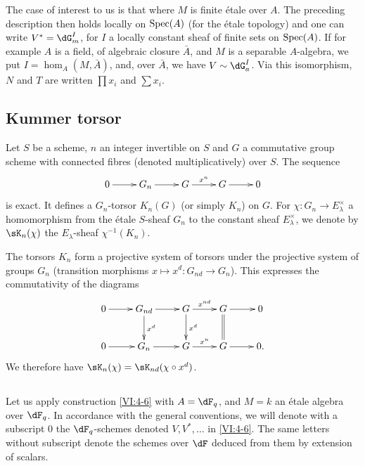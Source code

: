 The case of interest to us is that where $M$ is finite étale over $A$. The
preceding description then holds locally on $\operatorname{Spec}(A)$ (for the
étale topology) and one can write $V^\ast=\dG_m^I$, for $I$ a
locally constant sheaf of finite sets on $\operatorname{Spec}(A)$. If for example $A$ is a
field, of algebraic closure $\bar A$, and $M$ is a separable
$A$-algebra, we put $I=\hom_A(M,\bar A)$, and, over $\bar A$, we have
$V\sim \dG_a^I$. Via this isomorphism, $N$ and $T$ are written $\prod x_i$ and
$\sum x_i$. 





\subsection{Kummer torsor}\label{VI:4-7}

Let $S$ be a scheme, $n$ an integer invertible on $S$ and $G$ a commutative
group scheme with connected fibres (denoted multiplicatively) over $S$.
The sequence 
\[\xymatrix{
  0 \ar[r] 
    & G_n \ar[r] 
    & G \ar[r]^-{x^n} 
    & G \ar[r] 
    & 0 
}\]
is exact. It defines a $G_n$-torsor $K_n(G)$ (or simply $K_n$) on
$G$. For $\chi:G_n \to E_\lambda^\times$ a homomorphism from the étale
$S$-sheaf $G_n$ to the constant sheaf $E_\lambda^\times$, we denote by
$\sK_n(\chi)$ the $E_\lambda$-sheaf $\chi^{-1}(K_n)$.

The torsors $K_n$ form a projective system of torsors under the
projective system of groups $G_n$ (transition morphisms
$x\mapsto x^d:G_{n d}\to G_n$). This expresses the commutativity of the diagrams 
\[\xymatrix{
  0 \ar[r] 
    & G_{n d} \ar[r] \ar[d]^-{x^d} 
    & G \ar[r]^-{x^{n d}} \ar[d]^-{x^d} 
    & G \ar[r] \ar@{=}[d] 
    & 0 \\
  0 \ar[r] 
    & G_n \ar[r] 
    & G \ar[r]^-{x^n} 
    & G \ar[r] 
    & 0 \text{.} 
}\]
We therefore have $\sK_n(\chi) = \sK_{n d}(\chi\circ x^d)$. 





\subsection{}\label{VI:4-8}

Let us apply construction \ref{VI:4-6} with $A=\dF_q$, and $M=k$ an étale
algebra over $\dF_q$. In accordance with the general conventions, we will denote
with a subscript $0$ the $\dF_q$-schemes denoted $V,V^\ast,\ldots$ in
\ref{VI:4-6}. The same letters without subscript denote the schemes over
$\dF$ deduced from them by extension of scalars.

